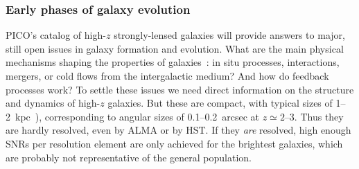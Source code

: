 \documentclass[PICOReport.tex]{subfiles}
\begin{document}

\subsubsection{Early phases of galaxy evolution}


PICO's catalog of high-$z$ strongly-lensed galaxies will provide answers to major, still open issues in galaxy formation and evolution. What are the main physical mechanisms shaping the properties of galaxies~\citep{SilkMamon2012, SomervilleDave2015}: in situ processes, interactions, mergers, or cold flows  from the intergalactic medium? And how do feedback processes work? To settle these issues we need direct information on the structure and dynamics of high-$z$ galaxies. But these are compact, with typical sizes of 1--2~kpc~\cite{Fujimoto2018}), corresponding to angular sizes of 0.1--0.2~arcsec at $z\simeq 2$--3. Thus they are hardly resolved, even by ALMA or by HST. If they {\it are} resolved, high enough \ac{SNR}s per resolution element are only achieved for the brightest galaxies, which are probably not representative of the general population.
\end{document}
